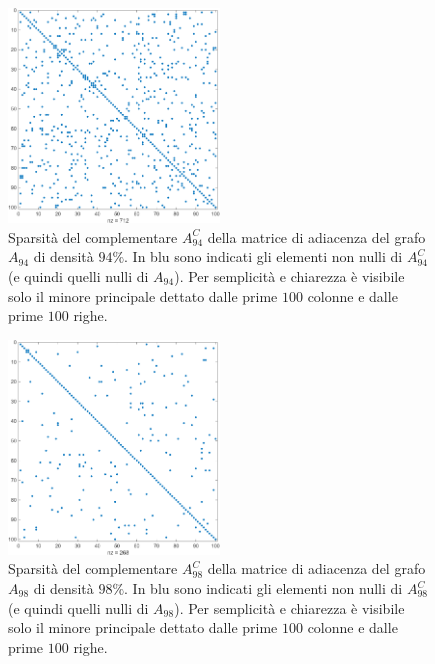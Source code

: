 \documentclass[a4paper]{article}
\begin{document}
\begin{figure}[H]
    \centering
    \includegraphics[width=0.5\textwidth]{images/94_spy.png} %
    \caption{Sparsità del complementare $A_{94}^C$ della matrice di adiacenza del grafo $A_{94}$ di densità $94\%$. In blu sono indicati gli elementi non nulli
    di $A_{94}^C$ (e quindi quelli nulli di $A_{94}$). Per semplicità e chiarezza è visibile solo il minore principale dettato dalle prime $100$ colonne e dalle
    prime $100$ righe.}
    \label{fig:spy_94}
\end{figure}

\begin{figure}[H]
    \centering
    \includegraphics[width=0.5\textwidth]{images/98_spy.png} %
    \caption{Sparsità del complementare $A_{98}^C$ della matrice di adiacenza del grafo $A_{98}$ di densità $98\%$. In blu sono indicati gli elementi non nulli
    di $A_{98}^C$ (e quindi quelli nulli di $A_{98}$). Per semplicità e chiarezza è visibile solo il minore principale dettato dalle prime $100$ colonne e dalle
    prime $100$ righe.}
    \label{fig:spy_98}
\end{figure}
\end{document}
